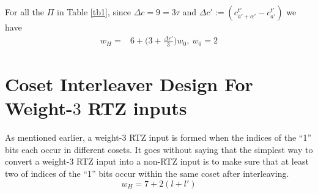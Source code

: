\documentclass[11pt, oneside, dvipdfmx]{book}
\begin{document}
For all the $\Pi$ in Table \ref{tb1}, since $\Delta c = 9=3\tau$ and $\Delta c':=(c_{a'+\alpha'}^{t'}-c_{a'}^{t'})$  we have
\begin{equation}
\begin{split}
w_H=&6+\Big(3+\frac{\Delta c'}{3}\Big)w_0,~w_0=2
\end{split}
\end{equation}








\section{Coset Interleaver Design For Weight-$3$ RTZ inputs}
As mentioned earlier, a weight-$3$ RTZ input is formed when the indices of the ``1'' bits each occur in different cosets.  It goes without saying that the simplest way to convert a weight-$3$ RTZ input into a non-RTZ input is to make sure that at least two of indices of the ``1'' bits occur within the same coset after interleaving.
\begin{equation}
w_H=
7+2(l+l') 
\label{eq6}
\end{equation}
\end{document}
